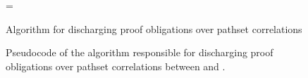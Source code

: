 \begin{figure}
\begin{algorithm}[H]
\begin{footnotesize}
\DontPrintSemicolon
\everypar={\nl}
\SetAlgoLined
{}
\end{footnotesize}
\caption{Algorithm for discharging proof obligations over pathset correlations}
\end{algorithm}
\caption{\label{algo:provepathset}Pseudocode of the algorithm responsible for discharging proof obligations over pathset correlations between \sprog{} and \cprog{}.}
\end{figure}